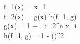 f_1(\textbf{x}) = x_1 \\
f_2(\textbf{x}) = g(\textbf{x}) h(f_1, g) \\
g(\textbf{x}) = 1 +  \sum_{i=2}^{n} x_i \\
h(f_1, g) = 1 - \left(\right)^2
